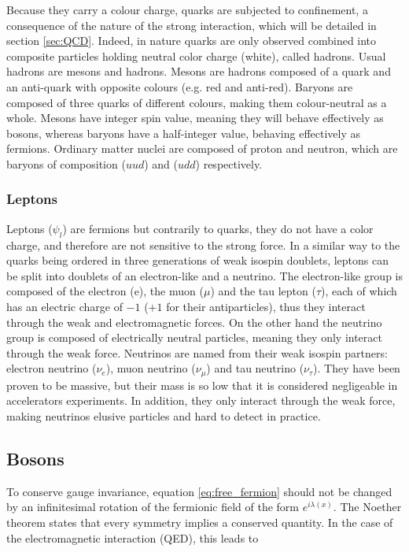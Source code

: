 Because they carry a colour charge, quarks are subjected to confinement, a consequence of the nature of the strong interaction, which will be detailed in section \ref{sec:QCD}. Indeed, in nature quarks are only observed combined into composite particles holding neutral color charge (white), called hadrons. Usual hadrons are mesons and hadrons. Mesons are hadrons composed of a quark and an anti-quark with opposite colours (e.g. red and anti-red). Baryons are composed of three quarks of different colours, making them colour-neutral as a whole. Mesons have integer spin value, meaning they will behave effectively as bosons, whereas baryons have a half-integer value, behaving effectively as fermions. Ordinary matter nuclei are composed of proton and neutron, which are baryons of composition ($uud$) and ($udd$) respectively.

\subsubsection{Leptons}

Leptons ($\psi_l$) are fermions but contrarily to quarks, they do not have a color charge, and therefore are not sensitive to the strong force. In a similar way to the quarks being ordered in three generations of weak isospin doublets, leptons can be split into doublets of an electron-like and a neutrino. The electron-like group is composed of the electron (e), the muon ($\mu$) and the tau lepton ($\tau$), each of which has an electric charge of $-1$ ($+1$ for their antiparticles), thus they interact through the weak and electromagnetic forces. On the other hand the neutrino group is composed of electrically neutral particles, meaning they only interact through the weak force. Neutrinos are named from their weak isospin partners: electron neutrino ($\nu_e$), muon neutrino ($\nu_{\mu}$) and tau neutrino ($\nu_{\tau}$). They have been proven to be massive, but their mass is so low that it is considered negligeable in accelerators experiments. In addition, they only interact through the weak force, making neutrinos elusive particles and hard to detect in practice.

\subsection{Bosons}

To conserve gauge invariance, equation \ref{eq:free_fermion} should not be changed by an infinitesimal rotation of the fermionic field of the form $e^{i\lambda(x)}$. The Noether theorem states that every symmetry implies a conserved quantity. In the case of the electromagnetic interaction (QED), this leads to


